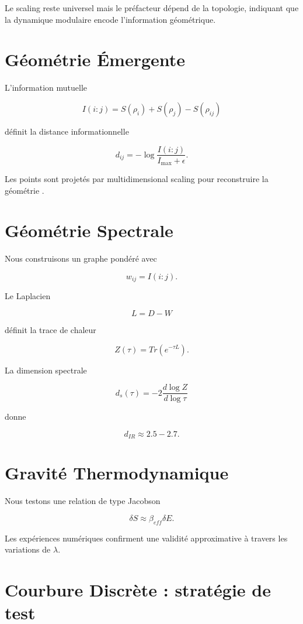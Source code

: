 \documentclass[11pt]{article}
\begin{document}
Le scaling reste universel mais le préfacteur dépend de la topologie, indiquant que la dynamique modulaire encode l'information géométrique.


\section{Géométrie Émergente}

L'information mutuelle

\[
I(i:j)=S(\rho_i)+S(\rho_j)-S(\rho_{ij})
\]

définit la distance informationnelle

\[
d_{ij}=-\log\frac{I(i:j)}{I_{\max}+\epsilon}.
\]

Les points sont projetés par multidimensional scaling pour reconstruire la géométrie \cite{vanraamsdonk}.

\section{Géométrie Spectrale}

Nous construisons un graphe pondéré avec

\[
w_{ij}=I(i:j).
\]

Le Laplacien

\[
L=D-W
\]

définit la trace de chaleur

\[
Z(\tau)=Tr(e^{-\tau L}).
\]

La dimension spectrale

\[
d_s(\tau)=-2\frac{d\log Z}{d\log\tau}
\]

donne

\[
d_{IR}\approx2.5-2.7.
\]

\section{Gravité Thermodynamique}

Nous testons une relation de type Jacobson \cite{jacobson}

\[
\delta S\approx \beta_{eff}\delta E.
\]

Les expériences numériques confirment une validité approximative à travers les variations de $\lambda$.

\section{Courbure Discrète : stratégie de test}
\end{document}
